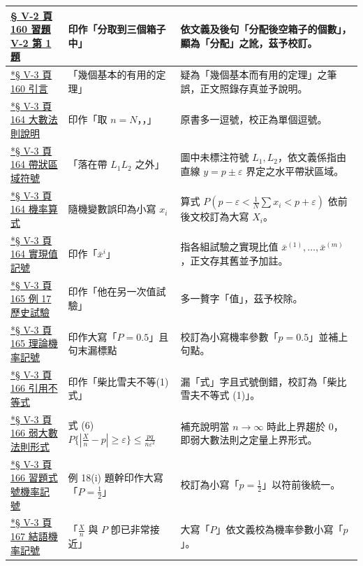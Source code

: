 \documentclass[a4paper,12pt,twoside]{article}
\begin{document}
\begin{xltabular}{\textwidth}{|p{3.2cm}|p{3.8cm}|X|}
\hline
\hyperref[note:b5-ch5-p160-fenpei]{§ V-2 頁 160 習題 V-2 第 1 題} & 
印作「分取到三個箱子中」 & 
依文義及後句「分配後空箱子的個數」，顯為「分配」之訛，茲予校訂。 \\
\hline
\hyperref[note:b5-ch5-p160-typo]{*§ V-3 頁 160 引言} & 
「幾個基本的有用的定理」 & 
疑為「幾個基本而有用的定理」之筆誤，正文照錄存真並予說明。 \\
\hline
\hyperref[note:b5-ch5-p164-comma]{*§ V-3 頁 164 大數法則說明} & 
印作「取 $n = N$，，」 & 
原書多一逗號，校正為單個逗號。 \\
\hline
\hyperref[note:b5-ch5-p164-strip]{*§ V-3 頁 164 帶狀區域符號} & 
「落在帶 $L_1 L_2$ 之外」 & 
圖中未標注符號 $L_1, L_2$，依文義係指由直線 $y = p \pm \varepsilon$ 界定之水平帶狀區域。 \\
\hline
\hyperref[note:b5-ch5-p164-rv]{*§ V-3 頁 164 機率算式} & 
隨機變數誤印為小寫 $x_i$ & 
算式 $P(p-\varepsilon < \frac{1}{N}\sum x_i < p+\varepsilon)$ 依前後文校訂為大寫 $X_i$。 \\
\hline
\hyperref[note:b5-ch5-p164-xi]{*§ V-3 頁 164 實現值記號} & 
印作「$\bar{x}^i$」 & 
指各組試驗之實現比值 $\bar{x}^{(1)}, \dots, \bar{x}^{(m)}$，正文存其舊並予加註。 \\
\hline
\hyperref[note:b5-ch5-p165-extra]{*§ V-3 頁 165 例 17 歷史試驗} & 
印作「他在另一次值試驗」 & 
多一贅字「值」，茲予校除。 \\
\hline
\hyperref[note:b5-ch5-p165-p]{*§ V-3 頁 165 理論機率記號} & 
印作大寫「$P = 0.5$」且句末漏標點 & 
校訂為小寫機率參數「$p = 0.5$」並補上句點。 \\
\hline
\hyperref[note:b5-ch5-p166-ineq1]{*§ V-3 頁 166 引用不等式} & 
印作「柴比雪夫不等(1)式」 & 
漏「式」字且式號倒錯，校訂為「柴比雪夫不等式 (1)」。 \\
\hline
\hyperref[note:b5-ch5-p166-wlln]{*§ V-3 頁 166 弱大數法則形式} & 
式 (6) $P\{|\frac{X}{n}-p| \ge \varepsilon\} \le \frac{pq}{n\varepsilon^2}$ & 
補充說明當 $n \to \infty$ 時此上界趨於 0，即弱大數法則之定量上界形式。 \\
\hline
\hyperref[note:b5-ch5-p166-p]{*§ V-3 頁 166 習題式號機率記號} & 
例 18(i) 題幹印作大寫「$P = \frac{1}{2}$」 & 
校訂為小寫「$p = \frac{1}{2}$」以符前後統一。 \\
\hline
\hyperref[note:b5-ch5-p167-p]{*§ V-3 頁 167 結語機率記號} & 
「$\frac{X}{n}$ 與 $P$ 卽已非常接近」 & 
大寫「$P$」依文義校為機率參數小寫「$p$」。 \\
\hline
\end{xltabular}
\clearpage
\renewcommand{\contentsname}{目\qquad 次}
\tableofcontents
\newpage

\end{document}
